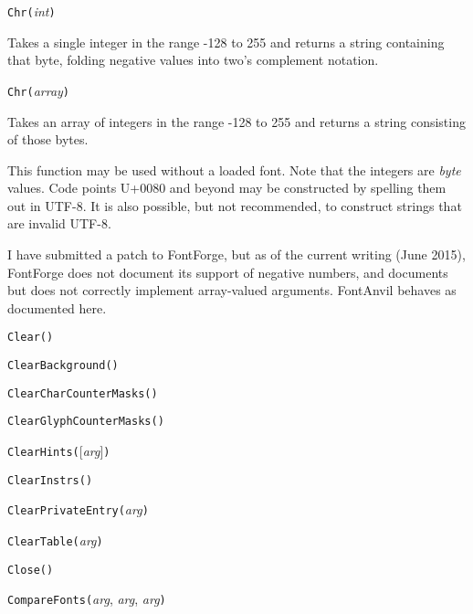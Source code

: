 \noindent\texttt{Chr(}\textit{int}\texttt{)}

Takes a single integer in the range -128 to 255 and returns a string
containing that byte, folding negative values into two's complement
notation.

\noindent\texttt{Chr(}\textit{array}\texttt{)}

Takes an array of integers in the range -128 to 255 and returns a string
consisting of those bytes.

This function may be used without a loaded font.  Note that the integers are
\emph{byte} values.  Code points U+0080 and beyond may be constructed by
spelling them out in UTF-8.  It is also possible, but not recommended, to
construct strings that are invalid UTF-8.

I have submitted a patch to FontForge, but as of the current writing (June
2015), FontForge does not document its support of negative numbers, and
documents but does not correctly implement array-valued
arguments.  FontAnvil behaves as documented here.


\noindent\texttt{Clear()}


\noindent\texttt{ClearBackground(}\texttt{)}


\noindent\texttt{ClearCharCounterMasks(}\texttt{)}


\noindent\texttt{ClearGlyphCounterMasks(}\texttt{)}


\noindent\texttt{ClearHints(}[\textit{arg}]\texttt{)}


\noindent\texttt{ClearInstrs(}\texttt{)}


\noindent\texttt{ClearPrivateEntry(}\textit{arg}\texttt{)}


\noindent\texttt{ClearTable(}\textit{arg}\texttt{)}


\noindent\texttt{Close(}\texttt{)}


\noindent\texttt{CompareFonts(}\textit{arg}, \textit{arg}, \textit{arg}\texttt{)}

